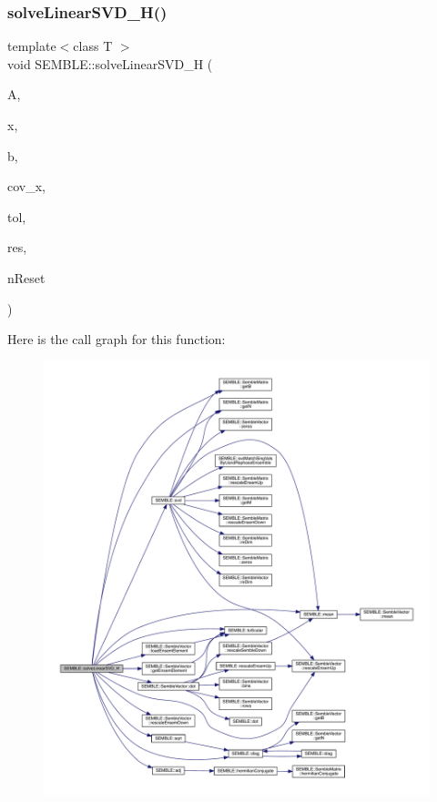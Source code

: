 \subsubsection{\texorpdfstring{solveLinearSVD\_H()}{solveLinearSVD\_H()}\hspace{0.1cm}{\footnotesize\ttfamily [2/2]}}
{\footnotesize\ttfamily template$<$class T $>$ \\
void S\+E\+M\+B\+L\+E\+::solve\+Linear\+S\+V\+D\+\_\+H (\begin{DoxyParamCaption}\item[{const \mbox{\hyperlink{structSEMBLE_1_1SembleMatrix}{Semble\+Matrix}}$<$ T $>$ \&}]{A,  }\item[{\mbox{\hyperlink{structSEMBLE_1_1SembleVector}{Semble\+Vector}}$<$ T $>$ \&}]{x,  }\item[{const \mbox{\hyperlink{structSEMBLE_1_1SembleVector}{Semble\+Vector}}$<$ T $>$ \&}]{b,  }\item[{\mbox{\hyperlink{structSEMBLE_1_1SembleMatrix}{Semble\+Matrix}}$<$ T $>$ \&}]{cov\+\_\+x,  }\item[{const double}]{tol,  }\item[{double \&}]{res,  }\item[{int \&}]{n\+Reset }\end{DoxyParamCaption})}

Here is the call graph for this function\+:
\nopagebreak
\begin{figure}[H]
\begin{center}
\leavevmode
\includegraphics[width=350pt]{d7/dfd/namespaceSEMBLE_a263ad714a1484ebb46be58d5ace2c796_cgraph}
\end{center}
\end{figure}
\mbox{\label{namespaceSEMBLE_a82589c0c91229b7b8d90ac6ad20bcf48}} 
